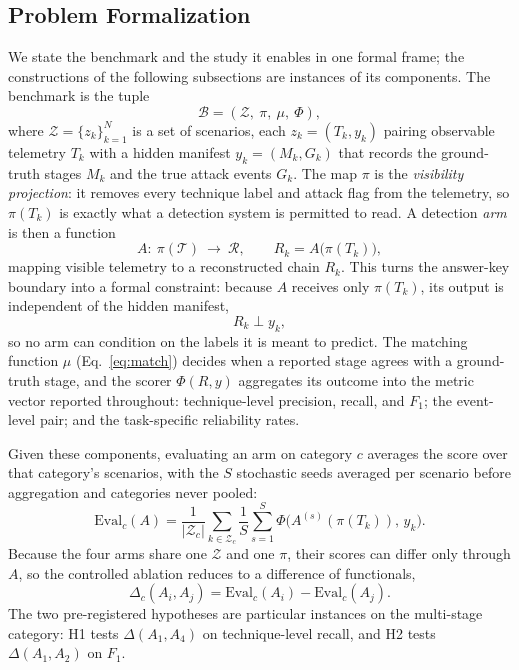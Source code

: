 \documentclass[journal]{IEEEtran}
\begin{document}
\subsection{Problem Formalization}
We state the benchmark and the study it enables in one formal frame; the constructions of the following
subsections are instances of its components. The benchmark is the tuple
\begin{equation}
\mathcal{B} = (\mathcal{Z},\ \pi,\ \mu,\ \Phi),
\end{equation}
where $\mathcal{Z}=\{z_k\}_{k=1}^{N}$ is a set of scenarios, each $z_k=(T_k,y_k)$ pairing observable
telemetry $T_k$ with a hidden manifest $y_k=(M_k,G_k)$ that records the ground-truth stages $M_k$ and the
true attack events $G_k$. The map $\pi$ is the \emph{visibility projection}: it removes every technique
label and attack flag from the telemetry, so $\pi(T_k)$ is exactly what a detection system is permitted
to read. A detection \emph{arm} is then a function
\begin{equation}
A:\ \pi(\mathcal{T})\ \to\ \mathcal{R},\qquad R_k=A\bigl(\pi(T_k)\bigr),
\end{equation}
mapping visible telemetry to a reconstructed chain $R_k$. This turns the answer-key boundary into a
formal constraint: because $A$ receives only $\pi(T_k)$, its output is independent of the hidden manifest,
\begin{equation}
R_k \perp y_k,
\end{equation}
so no arm can condition on the labels it is meant to predict. The matching function $\mu$
(Eq.~\ref{eq:match}) decides when a reported stage agrees with a ground-truth stage, and the scorer
$\Phi(R,y)$ aggregates its outcome into the metric vector reported throughout: technique-level
precision, recall, and $F_1$; the event-level pair; and the task-specific reliability rates.

Given these components, evaluating an arm on category $c$ averages the score over that category's
scenarios, with the $S$ stochastic seeds averaged per scenario before aggregation and categories never
pooled:
\begin{equation}
\mathrm{Eval}_c(A)=\frac{1}{|\mathcal{Z}_c|}\sum_{k\in\mathcal{Z}_c}\frac{1}{S}\sum_{s=1}^{S}
\Phi\bigl(A^{(s)}(\pi(T_k)),\,y_k\bigr).
\label{eq:eval}
\end{equation}
Because the four arms share one $\mathcal{Z}$ and one $\pi$, their scores can differ only through $A$, so
the controlled ablation reduces to a difference of functionals,
\begin{equation}
\Delta_c(A_i,A_j)=\mathrm{Eval}_c(A_i)-\mathrm{Eval}_c(A_j).
\label{eq:delta}
\end{equation}
The two pre-registered hypotheses are particular instances on the multi-stage category: H1 tests
$\Delta(A_1,A_4)$ on technique-level recall, and H2 tests $\Delta(A_1,A_2)$ on $F_1$.
\end{document}

